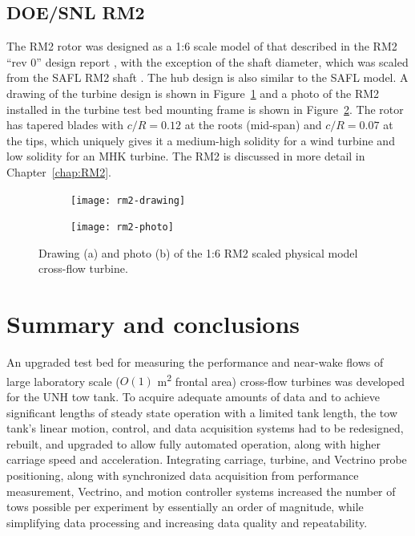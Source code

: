 \subsection{DOE/SNL RM2}

The RM2 rotor was designed as a 1:6 scale model of that described in the RM2
``rev 0'' design report \cite{Barone2011}, with the exception of the shaft
diameter, which was scaled from the SAFL RM2 shaft \cite{Hill2014}. The hub
design is also similar to the SAFL model. A drawing of the turbine design is
shown in Figure~\ref{fig:rm2-drawing} and a photo of the RM2 installed in the
turbine test bed mounting frame is shown in Figure~\ref{fig:rm2-photo}. The
rotor has tapered blades with $c/R=0.12$ at the roots (mid-span) and $c/R=0.07$
at the tips, which uniquely gives it a medium-high solidity for a wind turbine
and low solidity for an MHK turbine. The RM2 is discussed in more detail in
Chapter~\ref{chap:RM2}.

\begin{figure}
    \centering

    \begin{subfigure}{0.45\textwidth}
        \centering
        \texttt{[image: rm2-drawing]}
        \caption{}
        \label{fig:rm2-drawing}
    \end{subfigure}
    \begin{subfigure}{0.41\textwidth}
        \centering
        \texttt{[image: rm2-photo]}

        \caption{}
        \label{fig:rm2-photo}
    \end{subfigure}

    \caption{Drawing (a) and photo (b) of the 1:6 RM2 scaled physical model cross-flow turbine.}
    \label{fig:rm2}
\end{figure}


\section{Summary and conclusions}

An upgraded test bed for measuring the performance and near-wake flows of large
laboratory scale ($O(1)$ m\textsuperscript{2} frontal area) cross-flow turbines
was developed for the UNH tow tank. To acquire adequate amounts of data and to
achieve significant lengths of steady state operation with a limited tank
length, the tow tank's linear motion, control, and data acquisition systems had
to be redesigned, rebuilt, and upgraded to allow fully automated operation,
along with higher carriage speed and acceleration. Integrating carriage,
turbine, and Vectrino probe positioning, along with synchronized data
acquisition from performance measurement, Vectrino, and motion controller
systems increased the number of tows possible per experiment by essentially an
order of magnitude, while simplifying data processing and increasing data
quality and repeatability.

